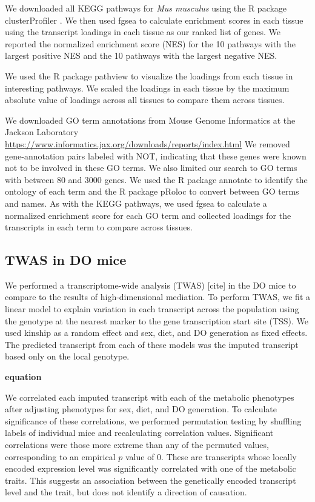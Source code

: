 \documentclass[
]{article}
\begin{document}
We downloaded all KEGG \cite{pmid36300620} pathways for
\textit{Mus musculus} using the R package clusterProfiler
\cite{pmid36300620}. We then used fgsea to calculate enrichment scores
in each tissue using the transcript loadings in each tissue as our
ranked list of genes. We reported the normalized enrichment score (NES)
for the 10 pathways with the largest positive NES and the 10 pathways
with the largest negative NES.

We used the R package pathview \cite{pmid23740750} to visualize the
loadings from each tissue in interesting pathways. We scaled the
loadings in each tissue by the maximum absolute value of loadings across
all tissues to compare them across tissues.

We downloaded GO term annotations from Mouse Genome Informatics at the
Jackson Laboratory \cite{pmid33231642}
\url{https://www.informatics.jax.org/downloads/reports/index.html} We
removed gene-annotation pairs labeled with NOT, indicating that these
genes were known not to be involved in these GO terms. We also limited
our search to GO terms with between 80 and 3000 genes. We used the R
package annotate \cite{R_annotate} to identify the ontology of each term
and the R package pRoloc \cite{pmid24413670} to convert between GO terms
and names. As with the KEGG pathways, we used fgsea to calculate a
normalized enrichment score for each GO term and collected loadings for
the transcripts in each term to compare across tissues.

\subsection{TWAS in DO mice}\label{twas-in-do-mice}

We performed a transcriptome-wide analysis (TWAS) {[}cite{]} in the DO
mice to compare to the results of high-dimensional mediation. To perform
TWAS, we fit a linear model to explain variation in each transcript
across the population using the genotype at the nearest marker to the
gene transcription start site (TSS). We used kinship as a random effect
and sex, diet, and DO generation as fixed effects. The predicted
transcript from each of these models was the imputed transcript based
only on the local genotype.

\textbf{equation}

We correlated each imputed transcript with each of the metabolic
phenotypes after adjusting phenotypes for sex, diet, and DO generation.
To calculate significance of these correlations, we performed
permutation testing by shuffling labels of individual mice and
recalculating correlation values. Significant correlations were those
more extreme than any of the permuted values, corresponding to an
empirical \(p\) value of 0. These are transcripts whose locally encoded
expression level was significantly correlated with one of the metabolic
traits. This suggests an association between the genetically encoded
transcript level and the trait, but does not identify a direction of
causation.
\end{document}
